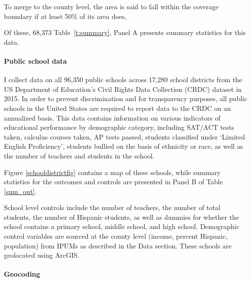 \documentclass[11pt]{article}
\begin{document}
To merge to the county level, the area is said to fall within the coverage boundary if at least 50\% of its area does, 

 Of these, 68,373  Table~\ref{t:summary}, Panel A presents summary statistics for this data.  

\paragraph{Public school data} I collect data on all 96,350 public schools across 17,280 school districts from the US Department of Education's Civil Rights Data Collection (CRDC) dataset in 2015. In order to prevent discrimination and for transparency purposes, all public schools in the United States are required to report data to the CRDC on an annualized basis. This data contains information on various indicators of educational performance by demographic category, including SAT/ACT tests taken, calculus courses taken, AP tests passed, students classified under `Limited English Proficiency', students bullied on the basis of ethnicity or race, as well as the number of teachers and students in the school.

 Figure \ref{schooldistrictfig} contains a map of these schools, while summary statistics for the outcomes and controls are presented in Panel B of Table \ref{sum_out}.

School level controls include the number of teachers, the number of total students, the number of Hispanic students, as well as dummies for whether the school contains a primary school, middle school, and high school. Demographic control variables are sourced at the county level (income, percent Hispanic, population) from IPUMs as described in the Data section. These schools are geolocated using ArcGIS.




\paragraph{Geocoding}
\end{document}
